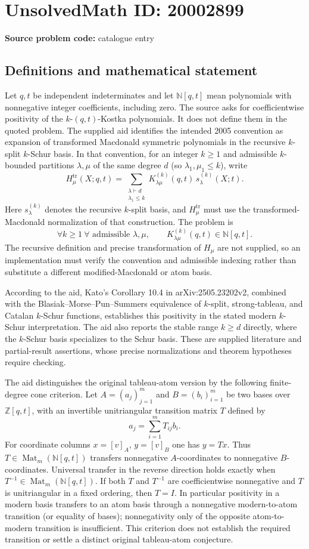 \documentclass[11pt]{article}
\newcommand{\N}{\mathbb{N}}
\newcommand{\Z}{\mathbb{Z}}
\begin{document}
\section*{UnsolvedMath ID: 20002899}
\textbf{Source problem code:} catalogue entry
\subsection{Definitions and mathematical statement}
Let $q,t$ be independent indeterminates and let $\N[q,t]$ mean polynomials with nonnegative integer coefficients, including zero. The source asks for coefficientwise positivity of the $k$-$(q,t)$-Kostka polynomials. It does not define them in the quoted problem. The supplied aid identifies the intended 2005 convention as expansion of transformed Macdonald symmetric polynomials in the recursive $k$-split $k$-Schur basis. In that convention, for an integer $k\geq1$ and admissible $k$-bounded partitions $\lambda,\mu$ of the same degree $d$ (so $\lambda_1,\mu_1\leq k$), write
\[
H^{\mathrm{tr}}_\mu(X;q,t)=\sum_{\substack{\lambda\vdash d\\\lambda_1\leq k}}
K^{(k)}_{\lambda\mu}(q,t)\,s^{(k)}_\lambda(X;t).
\]
Here $s^{(k)}_\lambda$ denotes the recursive $k$-split basis, and $H^{\mathrm{tr}}_\mu$ must use the transformed-Macdonald normalization of that construction. The problem is
\[
\forall k\geq1\ \forall\text{ admissible }\lambda,\mu,\qquad
K^{(k)}_{\lambda\mu}(q,t)\in\N[q,t].
\]
The recursive definition and precise transformation of $H_\mu$ are not supplied, so an implementation must verify the convention and admissible indexing rather than substitute a different modified-Macdonald or atom basis.

According to the aid, Kato's Corollary 10.4 in arXiv:2505.23202v2, combined with the Blasiak--Morse--Pun--Summers equivalence of $k$-split, strong-tableau, and Catalan $k$-Schur functions, establishes this positivity in the stated modern $k$-Schur interpretation. The aid also reports the stable range $k\geq d$ directly, where the $k$-Schur basis specializes to the Schur basis. These are supplied literature and partial-result assertions, whose precise normalizations and theorem hypotheses require checking.

The aid distinguishes the original tableau-atom version by the following finite-degree cone criterion. Let $A=(a_j)_{j=1}^m$ and $B=(b_i)_{i=1}^m$ be two bases over $\Z[q,t]$, with an invertible unitriangular transition matrix $T$ defined by
\[
a_j=\sum_{i=1}^m T_{ij}b_i.
\]
For coordinate columns $x=[v]_A$, $y=[v]_B$ one has $y=Tx$. Thus $T\in\operatorname{Mat}_m(\N[q,t])$ transfers nonnegative $A$-coordinates to nonnegative $B$-coordinates. Universal transfer in the reverse direction holds exactly when $T^{-1}\in\operatorname{Mat}_m(\N[q,t])$. If both $T$ and $T^{-1}$ are coefficientwise nonnegative and $T$ is unitriangular in a fixed ordering, then $T=I$. In particular positivity in a modern basis transfers to an atom basis through a nonnegative modern-to-atom transition (or equality of bases); nonnegativity only of the opposite atom-to-modern transition is insufficient. This criterion does not establish the required transition or settle a distinct original tableau-atom conjecture.
\end{document}
